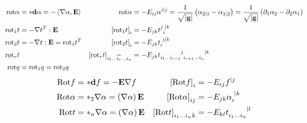 \documentclass[a4paper,10pt]{scrartcl}
\newcommand{\exd}{\mathbf{d}}
\newcommand{\rot}{\mathrm{rot}}
\newcommand{\Rot}{\mathrm{Rot}}
\newcommand{\gb}{\mathbf{g}}
\newcommand{\Eb}{\mathbf{E}}
\begin{document}
\begin{align*}
  \rot\alpha &= *\exd\alpha = -\left\langle \nabla\alpha , \Eb \right\rangle
          & \rot\alpha &= -E_{ij}\alpha^{i|j} = \frac{1}{\sqrt{|\gb|}}\left( \alpha_{2|1} - \alpha_{1|2} \right)
                                              = \frac{1}{\sqrt{|\gb|}}\left( \partial_{1}\alpha_{2} - \partial_{2}\alpha_{1} \right) \\
  \rot_{1}t &= -\nabla t^{T} :\Eb
          &\left[ \rot_{1}t \right]_{i} &= -E_{jk}\tensor{t}{^{j}_{i}^{|k}} \\
  \rot_{2}t &= -\nabla t : \Eb = \rot_{1}t^{T}
          &\left[ \rot_{2}t \right]_{i} &= -E_{jk}\tensor{t}{_{i}^{j|k}}\\
  \rot_{r}t &
          &\left[ \rot_{r}t \right]_{i_{1}\ldots \widehat{i_{r}} \ldots i_{n}} &= -E_{jk}\tensor{t}{_{i_{1}\ldots i_{r-1}}^{j}_{i_{r+1}\ldots i_{n}}^{|k}} \\
  \rot q &= \rot_{1} q = \rot_{2} q
\end{align*}
\begin{align*}
  \Rot f &= *\exd f = -\Eb\nabla f
          &\left[ \Rot f \right]_{i} &= -E_{ij}f^{|j} \\
  \Rot\alpha &= *_{2}\nabla\alpha = \left( \nabla\alpha \right) \Eb
             &\left[ \Rot\alpha \right]_{ij} &= -E_{jk}\tensor{\alpha}{_{i}^{|k}}\\
  \Rot t &=  *_{n}\nabla\alpha = \left( \nabla\alpha \right) \Eb
             &\left[ \Rot t \right]_{i_{1} \ldots i_{n} k} &= -E_{kl}\tensor{t}{_{i_{1} \ldots i_{n}}^{|l}}
\end{align*}
\end{document}

